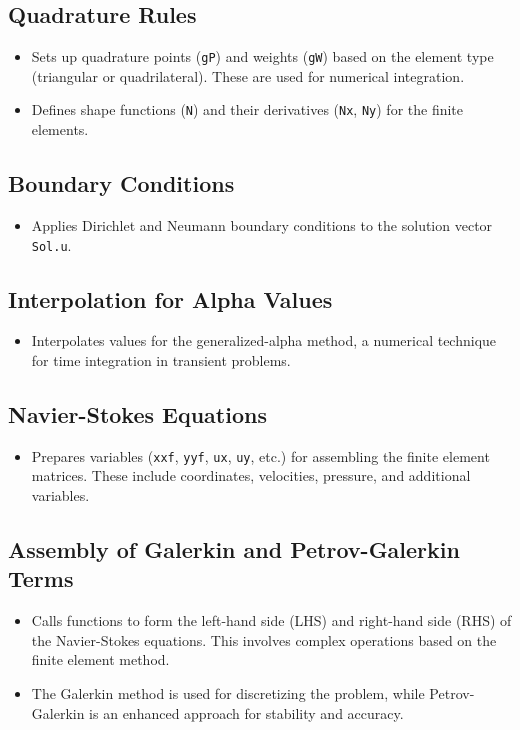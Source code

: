 \documentclass[a4paper,12pt]{article} %
\begin{document}
\subsection*{Quadrature Rules}
\begin{itemize}
    \item Sets up quadrature points (\texttt{gP}) and weights (\texttt{gW}) based on the element type (triangular or quadrilateral). These are used for numerical integration.
    \item Defines shape functions (\texttt{N}) and their derivatives (\texttt{Nx}, \texttt{Ny}) for the finite elements.
\end{itemize}

\subsection*{Boundary Conditions}
\begin{itemize}
    \item Applies Dirichlet and Neumann boundary conditions to the solution vector \texttt{Sol.u}.
\end{itemize}

\subsection*{Interpolation for Alpha Values}
\begin{itemize}
    \item Interpolates values for the generalized-alpha method, a numerical technique for time integration in transient problems.
\end{itemize}

\subsection*{Navier-Stokes Equations}
\begin{itemize}
    \item Prepares variables (\texttt{xxf}, \texttt{yyf}, \texttt{ux}, \texttt{uy}, etc.) for assembling the finite element matrices. These include coordinates, velocities, pressure, and additional variables.
\end{itemize}

\subsection*{Assembly of Galerkin and Petrov-Galerkin Terms}
\begin{itemize}
    \item Calls functions to form the left-hand side (LHS) and right-hand side (RHS) of the Navier-Stokes equations. This involves complex operations based on the finite element method.
    \item The Galerkin method is used for discretizing the problem, while Petrov-Galerkin is an enhanced approach for stability and accuracy.
\end{itemize}
\end{document}
